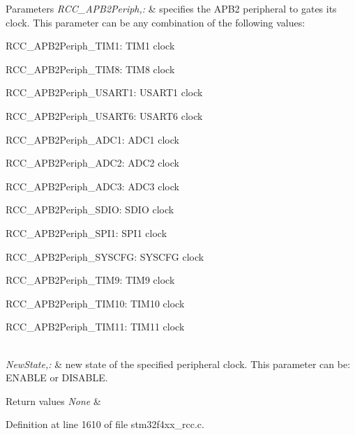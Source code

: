 \begin{DoxyParams}{Parameters}
{\em R\-C\-C\-\_\-\-A\-P\-B2\-Periph,\-:} & specifies the A\-P\-B2 peripheral to gates its clock. This parameter can be any combination of the following values\-: \begin{DoxyItemize}
\item R\-C\-C\-\_\-\-A\-P\-B2\-Periph\-\_\-\-T\-I\-M1\-: T\-I\-M1 clock \item R\-C\-C\-\_\-\-A\-P\-B2\-Periph\-\_\-\-T\-I\-M8\-: T\-I\-M8 clock \item R\-C\-C\-\_\-\-A\-P\-B2\-Periph\-\_\-\-U\-S\-A\-R\-T1\-: U\-S\-A\-R\-T1 clock \item R\-C\-C\-\_\-\-A\-P\-B2\-Periph\-\_\-\-U\-S\-A\-R\-T6\-: U\-S\-A\-R\-T6 clock \item R\-C\-C\-\_\-\-A\-P\-B2\-Periph\-\_\-\-A\-D\-C1\-: A\-D\-C1 clock \item R\-C\-C\-\_\-\-A\-P\-B2\-Periph\-\_\-\-A\-D\-C2\-: A\-D\-C2 clock \item R\-C\-C\-\_\-\-A\-P\-B2\-Periph\-\_\-\-A\-D\-C3\-: A\-D\-C3 clock \item R\-C\-C\-\_\-\-A\-P\-B2\-Periph\-\_\-\-S\-D\-I\-O\-: S\-D\-I\-O clock \item R\-C\-C\-\_\-\-A\-P\-B2\-Periph\-\_\-\-S\-P\-I1\-: S\-P\-I1 clock \item R\-C\-C\-\_\-\-A\-P\-B2\-Periph\-\_\-\-S\-Y\-S\-C\-F\-G\-: S\-Y\-S\-C\-F\-G clock \item R\-C\-C\-\_\-\-A\-P\-B2\-Periph\-\_\-\-T\-I\-M9\-: T\-I\-M9 clock \item R\-C\-C\-\_\-\-A\-P\-B2\-Periph\-\_\-\-T\-I\-M10\-: T\-I\-M10 clock \item R\-C\-C\-\_\-\-A\-P\-B2\-Periph\-\_\-\-T\-I\-M11\-: T\-I\-M11 clock \end{DoxyItemize}
\\
\hline
{\em New\-State,\-:} & new state of the specified peripheral clock. This parameter can be\-: E\-N\-A\-B\-L\-E or D\-I\-S\-A\-B\-L\-E. \\
\hline
\end{DoxyParams}

\begin{DoxyRetVals}{Return values}
{\em None} & \\
\hline
\end{DoxyRetVals}


Definition at line 1610 of file stm32f4xx\-\_\-rcc.\-c.

